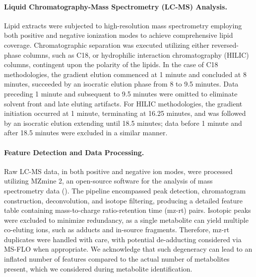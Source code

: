 \documentclass[9pt,twocolumn,twoside]{rilabRxiv}
\begin{document}
\paragraph{Liquid Chromatography-Mass Spectrometry (LC-MS) Analysis.} Lipid extracts were subjected to high-resolution mass spectrometry employing both positive and negative ionization modes to achieve comprehensive lipid coverage. Chromatographic separation was executed utilizing either reversed-phase columns, such as C18, or hydrophilic interaction chromatography (HILIC) columns, contingent upon the polarity of the lipids. In the case of C18 methodologies, the gradient elution commenced at 1 minute and concluded at 8 minutes, succeeded by an isocratic elution phase from 8 to 9.5 minutes. Data preceding 1 minute and subsequent to 9.5 minutes were omitted to eliminate solvent front and late eluting artifacts. For HILIC methodologies, the gradient initiation occurred at 1 minute, terminating at 16.25 minutes, and was followed by an isocratic elution extending until 18.5 minutes; data before 1 minute and after 18.5 minutes were excluded in a similar manner.

\paragraph{Feature Detection and Data Processing.} Raw LC-MS data, in both positive and negative ion modes, were processed utilizing MZmine 2, an open-source software for the analysis of mass spectrometry data (\cite{Pluskal2010MZmine2}). The pipeline encompassed peak detection, chromatogram construction, deconvolution, and isotope filtering, producing a detailed feature table containing mass-to-charge ratio-retention time (mz-rt) pairs. Isotopic peaks were excluded to minimize redundancy, as a single metabolite can yield multiple co-eluting ions, such as adducts and in-source fragments. Therefore, mz-rt duplicates were handled with care, with potential de-adducting considered via MS-FLO when appropriate. We acknowledge that such degeneracy can lead to an inflated number of features compared to the actual number of metabolites present, which we considered during metabolite identification. 
\end{document}
